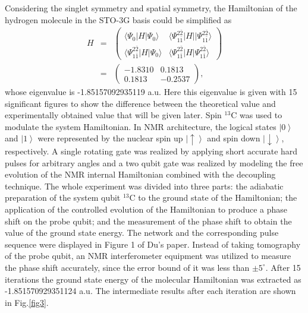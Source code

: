 \documentclass[8.5pt,twoside,twocolumn]{article}
\begin{document}
Considering the singlet symmetry and spatial symmetry, the Hamiltonian of the hydrogen molecule in the STO-3G basis could be simplified as\cite{Hydrogen}
\begin{eqnarray}
        H&=&
        \begin{pmatrix}
            \langle\Psi_0|H|\Psi_0\rangle & \langle\Psi_{1\bar{1}}^{2\bar{2}}|H||\Psi_{1\bar{1}}^{2\bar{2}}\rangle\\
            \langle\Psi_{1\bar{1}}^{2\bar{2}}|H|\Psi_0\rangle & \langle\Psi_{1\bar{1}}^{2\bar{2}}|H|\Psi_{1\bar{1}}^{2\bar{2}}\rangle
            \end{pmatrix}\nonumber\\
        &=& \begin{pmatrix}
            -1.8310 & 0.1813\\
            0.1813 & -0.2537
            \end{pmatrix},
\end{eqnarray}
whose eigenvalue is -1.85157092935119 a.u. Here this eigenvalue is given with 15 significant figures to show the difference between the theoretical value and experimentally obtained value that will be given later.
Spin $^{13}$C was used to modulate the system Hamiltonian.
In NMR architecture, the logical states $\left\vert 0 \right\rangle$
and $\left\vert 1 \right\rangle$ were represented by the nuclear
spin up $\left\vert \uparrow \right\rangle$ and
spin down $\left\vert \downarrow \right\rangle$, respectively.
A single rotating gate was realized by applying short accurate hard
pulses for arbitrary angles and a two qubit gate was realized
by modeling the free evolution of the NMR internal Hamiltonian
combined with the decoupling technique.\cite{NMR_review_1}
The whole experiment was divided into three parts:
the adiabatic preparation of the system qubit $^{13}$C to
the ground state of the Hamiltonian; the application of the
controlled evolution of the Hamiltonian
to produce a phase shift on the probe qubit;
and the measurement of the phase shift to obtain
the value of the ground state energy.
The network and the corresponding pulse sequence were
displayed in Figure 1 of Du's paper.\cite{NMR_static}
Instead of taking tomography of the probe qubit,
an NMR interferometer equipment was utilized to measure
the phase shift accurately, since the error bound of it
was less than $\pm 5^{\circ}$. After 15 iterations the ground
state energy of the molecular Hamiltonian was extracted as
 -1.851570929351124 a.u.
The intermediate results after each iteration are
shown in Fig.\ref{fig3}.
\end{document}
